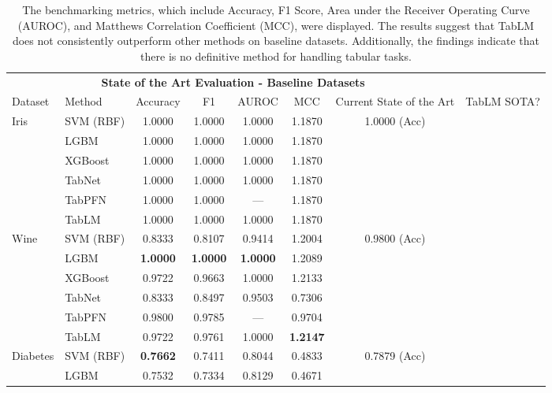 \documentclass{article}
\newcommand{\xmark}{\ding{55}}%
\theoremstyle{plain}
\theoremstyle{definition}
\theoremstyle{remark}
\begin{document}
\begin{table}[h!]
\caption{The benchmarking metrics, which include Accuracy, F1 Score, Area under the Receiver Operating Curve (AUROC), and Matthews Correlation Coefficient (MCC), were displayed. The results suggest that TabLM does not consistently outperform other methods on baseline datasets. Additionally, the findings indicate that there is no definitive method for handling tabular tasks.}
\vskip 0.15in
\begin{center}
\label{evaluation}
\begin{small}
\begin{sc}
\begin{adjustbox}{width=\textwidth}
\begin{tabular}{p{2cm}p{2.8cm}|cccc|c|c}
\toprule
\multicolumn{7}{c}{\textbf{State of the Art Evaluation - Baseline Datasets}} \\  %
Dataset & Method & Accuracy & F1 & AUROC & MCC & Current State of the Art & TabLM SOTA? \\
\hline
\multirow{6}{*}{Iris} & SVM (RBF)&1.0000 &1.0000 &1.0000& 1.1870&\multirow{6}{*}{1.0000 (Acc)\cite{ojha2020multi}}&\multirow{6}{*}{\xmark}\\ 
& LGBM&1.0000 &1.0000 &1.0000& 1.1870&\\ 
& XGBoost&1.0000 &1.0000 &1.0000& 1.1870&\\ 
& TabNet&1.0000 &1.0000 &1.0000& 1.1870&\\
& TabPFN&1.0000 &1.0000 &---& 1.1870&\\ 
& TabLM &1.0000 &1.0000 &1.0000& 1.1870&\\ 
\hline
\multirow{6}{*}{Wine} & SVM (RBF)&0.8333&0.8107&0.9414&1.2004&\multirow{6}{*}{0.9800 (Acc) \cite{di2020mutual}}&\multirow{6}{*}{\xmark}\\ 
& LGBM&\textbf{1.0000}&\textbf{1.0000}&\textbf{1.0000}&1.2089&\\ 
& XGBoost&0.9722&0.9663&1.0000&1.2133&\\ 
& TabNet&0.8333&0.8497&0.9503&0.7306&\\
& TabPFN&0.9800&0.9785&---&0.9704&\\ 
& TabLM &0.9722&0.9761&1.0000&\textbf{1.2147}&\\ 
\hline
\multirow{6}{*}{Diabetes} & SVM (RBF)&\textbf{0.7662}&0.7411&0.8044&0.4833&\multirow{6}{*}{0.7879 (Acc) \cite{sarkar2022xbnet}}&\multirow{6}{*}{\xmark}\\ 
& LGBM&0.7532&0.7334&0.8129&0.4671&\\ 

\end{tabular}
\end{adjustbox}
\end{sc}
\end{small}
\end{center}
\end{table}
\end{document}
